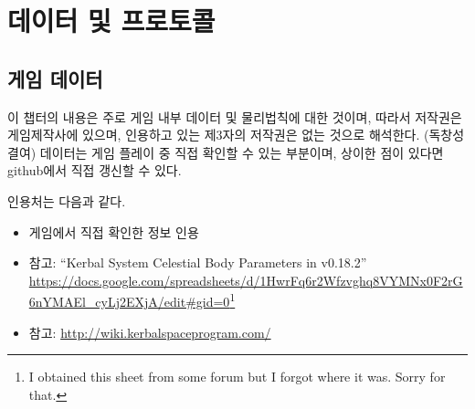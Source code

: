 \part{데이터 및 프로토콜}
\chapter{게임 데이터}
이 챕터의 내용은 주로 게임 내부 데이터 및 물리법칙에 대한 것이며, 
따라서 저작권은 게임제작사에 있으며, 인용하고 있는 제3자의 저작권은 없는 것으로 해석한다. (독창성 결여)
데이터는 게임 플레이 중 직접 확인할 수 있는 부분이며, 상이한 점이 있다면 github에서 직접 갱신할 수 있다.

인용처는 다음과 같다.
\begin{itemize}
\item 게임에서 직접 확인한 정보 인용
\item 참고: ``Kerbal System Celestial Body Parameters in v0.18.2'' \url{https://docs.google.com/spreadsheets/d/1HwrFq6r2Wfzvghq8VYMNx0F2rG6nYMAEl_cyLj2EXjA/edit#gid=0}\footnote{I obtained this sheet from some forum but I forgot where it was. Sorry for that.}
\item 참고: \url{http://wiki.kerbalspaceprogram.com/}
\end{itemize}

